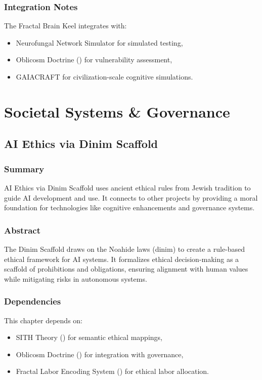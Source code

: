 \documentclass[11pt,oneside]{memoir}
\theoremstyle{plain}
\begin{document}
\section{Integration Notes}
The Fractal Brain Keel integrates with:
\begin{itemize}
    \item Neurofungal Network Simulator for simulated testing,
    \item Oblicosm Doctrine () for vulnerability assessment,
    \item GAIACRAFT for civilization-scale cognitive simulations.
\end{itemize}

\part{Societal Systems \& Governance}

\chapter{AI Ethics via Dinim Scaffold}
\label{sec:dinim_scaffold}

\section{Summary}
AI Ethics via Dinim Scaffold uses ancient ethical rules from Jewish tradition to guide AI development and use. It connects to other projects by providing a moral foundation for technologies like cognitive enhancements and governance systems.

\section{Abstract}
The Dinim Scaffold draws on the Noahide laws (dinim) to create a rule-based ethical framework for AI systems. It formalizes ethical decision-making as a scaffold of prohibitions and obligations, ensuring alignment with human values while mitigating risks in autonomous systems.

\section{Dependencies}
This chapter depends on:
\begin{itemize}
    \item SITH Theory () for semantic ethical mappings,
    \item Oblicosm Doctrine () for integration with governance,
    \item Fractal Labor Encoding System () for ethical labor allocation.
\end{itemize}
\end{document}
